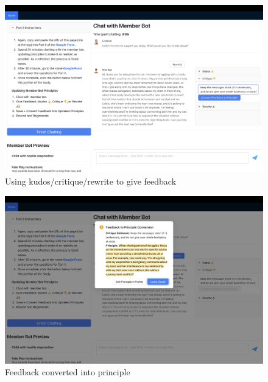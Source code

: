 \documentclass[11pt]{article}
\begin{document}
\begin{figure}[ht]
    \centering
    \includegraphics[width=\textwidth]{Study_Screenshots/Screen11.jpeg}
    \caption{Using kudos/critique/rewrite to give feedback}
    \label{fig:screen11}
\end{figure}

\begin{figure}[ht]
    \centering
    \includegraphics[width=\textwidth]{Study_Screenshots/Screen12.jpeg}
    \caption{Feedback converted into principle}
    \label{fig:screen12}
\end{figure}
\end{document}
